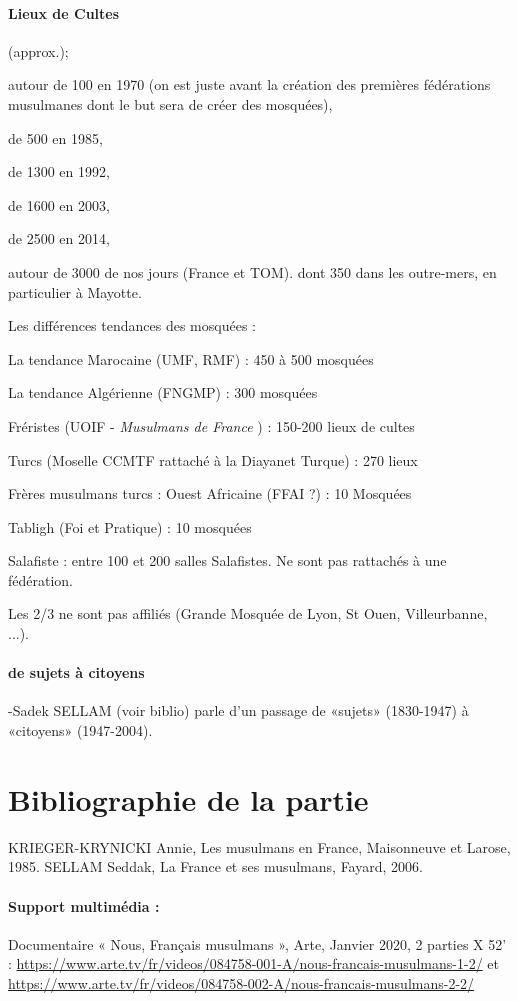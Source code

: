 \paragraph{Lieux de Cultes}
 (approx.); 
 \bi
 
\item  autour de 100 en 1970 (on est juste avant la création des premières fédérations musulmanes dont le but sera de créer des mosquées), \item de 500 en 1985, \item de 1300 en 1992, \item de 1600 en 2003, \item de 2500 en 2014, \item autour de 3000 de nos jours (France et TOM). dont 350 dans les outre-mers, en particulier à Mayotte. 
\ei

Les différences tendances des mosquées : 
\bi
\item La tendance Marocaine (UMF, RMF) : 450 à 500 mosquées
\item La tendance Algérienne (FNGMP) : 300 mosquées
\item Fréristes (UOIF - \textit{Musulmans de France} ) : 150-200 lieux de cultes
\item Turcs (Moselle CCMTF rattaché à la Diayanet Turque) : 270 lieux  
\item Frères musulmans turcs :
Ouest Africaine (FFAI ?)  : 10 Mosquées
\item Tabligh (Foi et Pratique) : 10 mosquées
\item Salafiste : entre 100 et 200 salles Salafistes. Ne sont pas rattachés à une fédération.
\item Les 2/3 ne sont pas affiliés (Grande Mosquée de Lyon, St Ouen, Villeurbanne, ...). 
\ei


\paragraph{de sujets à citoyens}
-Sadek SELLAM (voir biblio) parle d’un passage de «sujets» (1830-1947) à «citoyens» (1947-2004).


\section{Bibliographie de la partie}
\cite{Arkoun:histoire}
KRIEGER-KRYNICKI Annie, Les musulmans en France, Maisonneuve et Larose,
1985.
SELLAM Seddak, La France et ses musulmans, Fayard, 2006.
\paragraph{Support multimédia :}
Documentaire « Nous, Français musulmans », Arte, Janvier 2020, 2 parties X 52’ :
\url{https://www.arte.tv/fr/videos/084758-001-A/nous-francais-musulmans-1-2/} et
\url{https://www.arte.tv/fr/videos/084758-002-A/nous-francais-musulmans-2-2/}


